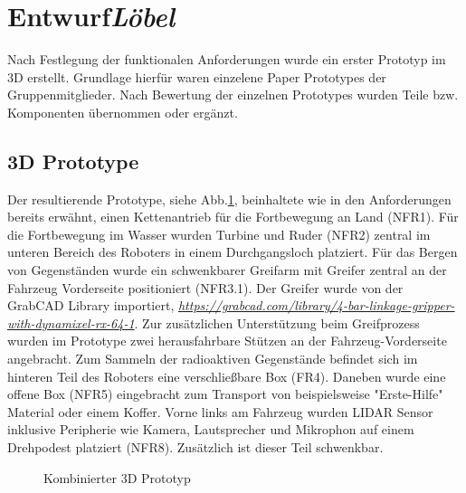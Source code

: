 \section{Entwurf\hfill\textnormal{\emph{Löbel}}}
Nach Festlegung der funktionalen Anforderungen wurde ein erster Prototyp im 3D erstellt. Grundlage hierfür waren einzelene Paper Prototypes der Gruppenmitglieder. Nach Bewertung der einzelnen Prototypes wurden Teile bzw. Komponenten übernommen oder ergänzt. 


\subsection{3D Prototype}
Der resultierende Prototype, siehe Abb.\ref{fig:model_proto}, beinhaltete wie in den Anforderungen bereits erwähnt, einen Kettenantrieb für die Fortbewegung an Land (NFR1). Für die Fortbewegung im Wasser wurden Turbine und Ruder (NFR2) zentral im unteren Bereich des Roboters in einem Durchgangsloch platziert. Für das Bergen von Gegenständen wurde ein schwenkbarer Greifarm mit Greifer zentral an der Fahrzeug Vorderseite positioniert (NFR3.1). Der Greifer wurde von der GrabCAD Library importiert, \textit{\url{https://grabcad.com/library/4-bar-linkage-gripper-with-dynamixel-rx-64-1}}. Zur zusätzlichen Unterstützung beim Greifprozess wurden im Prototype zwei herausfahrbare Stützen an der Fahrzeug-Vorderseite angebracht. Zum Sammeln der radioaktiven Gegenstände befindet sich im hinteren Teil des Roboters eine verschließbare Box (FR4). Daneben wurde eine offene Box (NFR5) eingebracht zum Transport von beispielsweise "Erste-Hilfe" Material oder einem Koffer. Vorne links am Fahrzeug wurden LIDAR Sensor inklusive Peripherie wie Kamera, Lautsprecher und Mikrophon auf einem Drehpodest platziert (NFR8). Zusätzlich ist dieser Teil schwenkbar.

\begin{figure}[H]
  \caption{Kombinierter 3D Prototyp}
  \label{fig:model_proto}
\end{figure}